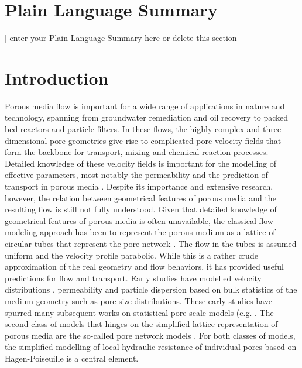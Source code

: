 \documentclass[draft]{agujournal2019}
\begin{document}
\section*{Plain Language Summary}
[ enter your Plain Language Summary here or delete this section]


%
%

\section{Introduction}

Porous media flow is important for a wide range of applications in nature and technology, spanning from groundwater remediation and oil recovery to packed bed reactors and particle filters. In these flows, the highly complex and three-dimensional pore geometries give rise to complicated pore velocity fields that form the backbone for transport, mixing and chemical reaction processes. Detailed knowledge of these velocity fields is important for the modelling of effective parameters, most notably the permeability and the prediction of transport in porous media \cite{bear_dynamics_1972,scheidegger_physics_1974}. Despite its importance and extensive research, however, the relation between geometrical features of porous media and the resulting flow is still not fully understood.
Given that detailed knowledge of geometrical features of porous media is often unavailable, the classical flow modeling approach has been to represent the porous medium as a lattice of circular tubes that represent the pore network \cite{scheidegger_physics_1974}. The flow in the tubes is assumed uniform and the velocity profile parabolic. While this is a rather crude approximation of the real geometry and flow behaviors, it has provided useful predictions for flow and transport. Early studies have modelled velocity distributions \cite{haring_statistical_1970}, permeability \cite{fatt_network_1956,katz_quantitative_1986} and particle dispersion \cite{saffman_theory_1959} based on bulk statistics of the medium geometry such as pore size distributions. These early studies have spurred many subsequent works on statistical pore scale models (e.g. \cite{dullien_single_1975,kutsovsky_nmr_1996,maier_simulation_1999,de_anna_prediction_2017,dentz_mechanisms_2018}. The second class of models that hinges on the simplified lattice representation of porous media are the so-called pore network models \cite{thompson_modeling_1997}. For both classes of models, the simplified modelling of local hydraulic resistance of individual pores based on Hagen-Poiseuille is a central element.
\end{document}
